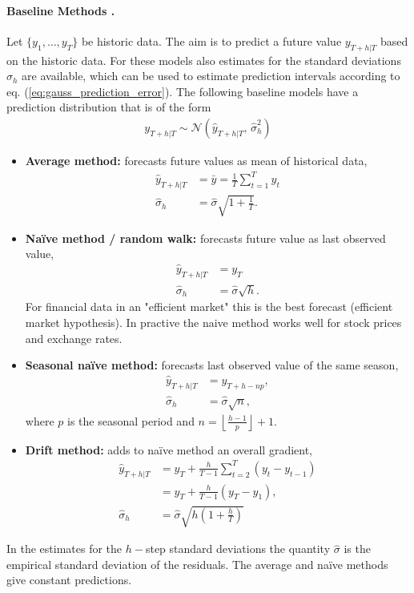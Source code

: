 \documentclass[12pt,a4paper]{article}
\begin{document}
\paragraph{Baseline Methods \cite{hyndman_forecasting_principles_2018}.}
Let $\{y_1, \dots, y_T\}$ be historic data. The aim is to predict a future value $y_{T+h | T}$ based on the historic data. For these models also estimates for the standard deviations $\hat\sigma_h$ are available, which can be used to estimate prediction intervals according to eq. (\ref{eq:gauss_prediction_error}). The following baseline models have a prediction distribution that is of the form
\begin{align}
	  y_{T+h | T}	\sim \mathcal {N} (\hat y_{T+h | T}, \, \hat \sigma_h^2)
\end{align}
\begin{itemize}
	\item \textbf{Average method:} forecasts future values as mean of historical data, 
	\begin{align}
	\hat y_{T+h | T} & = \bar y= \frac{1}{T}\sum_{t=1} ^T y_t \\ 
	\hat \sigma_h &= \hat \sigma \sqrt{1+\frac{1}{T}}. 
	\end{align}
	\item \textbf{Na\"ive method / random walk:} forecasts future value as last observed value, 
	\begin{align}
	\hat y_{T+h | T} &= y_T \\
	\hat \sigma_h &= \hat \sigma \sqrt{h}. 
	\end{align}
	For financial data in an  "efficient market"  this is the best forecast (efficient market hypothesis). In practive the naive method works well for stock prices and exchange rates.
	\item \textbf{Seasonal na\"ive method:} forecasts last observed value of the same season, 
	\begin{align}
	\hat y_{T+h | T} &=y_{T+h-np}, \\
	\hat \sigma_h &= \hat \sigma \sqrt{n}, 
	\end{align}
	where $p$ is the seasonal period and  $n = \left \lfloor{\frac{h-1}{p}}\right \rfloor + 1$. 
	\item \textbf{Drift method:} adds to na\"ive method an overall gradient,   
	\begin{align}
	\hat y_{T+h | T} &= y_{T} +  \frac{h}{T-1} \sum_{t=2}^{T} \left(y_t - y_{t-1}\right) \\ &= y_{T} +  \frac{h}{T-1}  \left(y_T - y_1\right), \\
	\hat \sigma_h &= \hat \sigma \sqrt{h\left(1 + \frac{h}{T}\right)}
	\end{align}
\end{itemize}
In the estimates for the $h-$step standard deviations the quantity $\hat \sigma$ is the empirical standard deviation of the residuals.  The average and na\"ive methods give constant predictions. 
\end{document}
